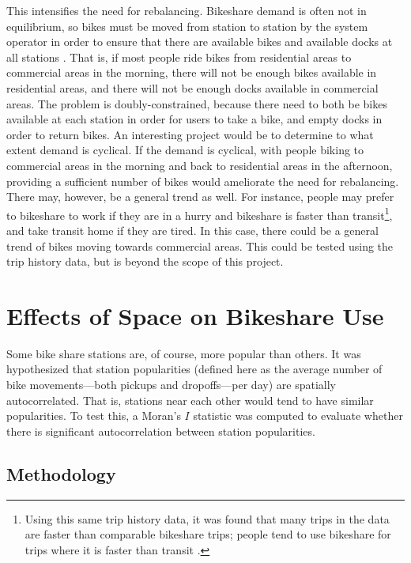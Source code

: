 \documentclass[letterpaper,11pt]{article}
\begin{document}
This intensifies the need for rebalancing. Bikeshare demand is often
not in equilibrium, so bikes must be moved from station to station by
the system operator in order to ensure that there are available bikes
and available docks at all stations \autocite[108]{IDAE2007}. That is,
if most people ride bikes from residential areas to commercial areas
in the morning, there will not be enough bikes available in
residential areas, and there will not be enough docks available in
commercial areas. The problem is doubly-constrained, because there
need to both be bikes available at each station in order for users to
take a bike, and empty docks in order to return bikes. An interesting
project would be to determine to what extent demand is cyclical. If
the demand is cyclical, with people biking to commercial areas in the
morning and back to residential areas in the afternoon, providing a
sufficient number of bikes would ameliorate the need for rebalancing.
There may, however, be a general trend as well. For instance, people
may prefer to bikeshare to work if they are in a hurry and bikeshare
is faster than transit\footnote{Using this same trip history data, it
  was found that many trips in the data are faster than comparable
  bikeshare trips; people tend to use bikeshare for trips where it is
  faster than transit \autocite{Wong2012}.}, and take transit
home if they are tired. In this case, there could be a general trend
of bikes moving towards commercial areas. This could be tested using
the trip history data, but is beyond the scope of this project.

\section{Effects of Space on Bikeshare Use}

Some bike share stations are, of course, more popular than others. It
was hypothesized that station popularities (defined here as the
average number of bike movements---both pickups and dropoffs---per
day) are spatially autocorrelated. That is, stations near each other
would tend to have similar popularities. To test this, a Moran's $I$
statistic was computed to evaluate whether there is significant
autocorrelation between station popularities.

\subsection{Methodology}
\end{document}
